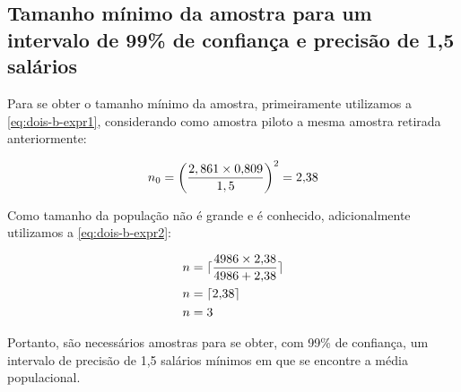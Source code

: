 \subsection{Tamanho mínimo da amostra para um intervalo de 99\% de confiança e precisão de 1,5 salários}
Para se obter o tamanho mínimo da amostra, primeiramente utilizamos a \autoref{eq:dois-b-expr1}, considerando 
como amostra piloto a mesma amostra retirada anteriormente:

\begin{align*}
	n_0 = \left (\frac{2,861 \times \TRESsd}{1,5} \right)^2 = \TRESnZero %
\end{align*}

Como tamanho da população não é grande e é conhecido, adicionalmente utilizamos a \autoref{eq:dois-b-expr2}:

\begin{align*}
		n &= \lceil \frac{\num{4986} \times \num{2.38}}{\num{4986} + \num{2.38}} \rceil \\
		n &= \lceil \num{2.38} \rceil \\
		n &= \num{3}
\end{align*}

Portanto, são necessários \TRESnZeroCorrigidoRounded amostras para se obter, com 99\% de confiança,
um intervalo de precisão de 1,5 salários mínimos em que se encontre a média populacional.



